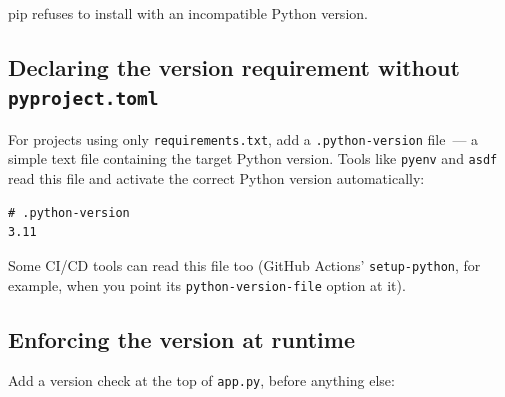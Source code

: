 \noindent{}pip refuses to install with an incompatible Python version.

\subsection*{\texorpdfstring{Declaring the version requirement without \texttt{pyproject.toml}}{Declaring the version requirement without pyproject.toml}}\label{14-runtime-contract:declaring-the-version-requirement-without-pyprojecttoml}

For projects using only \texttt{requirements.txt}, add a \texttt{.python-version} file~--- a simple text file containing the target Python version. Tools like \texttt{pyenv} and \texttt{asdf} read this file and activate the correct Python version automatically:

\begin{outputbox}[short]
\begin{Verbatim}[fontsize=\codesize, breaklines, breakanywhere, breaksymbolleft={\tiny\textcolor{muted}{$\hookrightarrow$}}]
# .python-version
3.11
\end{Verbatim}
\end{outputbox}

\noindent{}Some CI/CD tools can read this file too (GitHub Actions' \texttt{setup-python}, for example, when you point its \texttt{python-version-file} option at it).

\subsection*{Enforcing the version at runtime}\label{14-runtime-contract:enforcing-the-version-at-runtime}

Add a version check at the top of \texttt{app.py}, before anything else:

